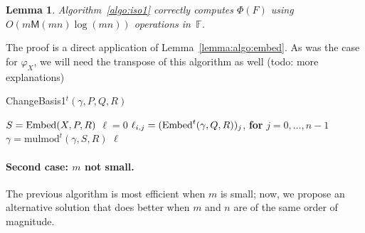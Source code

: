 \documentclass[12pt]{article}
\def\M {\ensuremath{\mathsf{M}}}
\def\F {\ensuremath{\mathbb{F}}}
\def\mulmod {\ensuremath{\mathrm{mulmod}}}
\newtheorem{Lemma}{Lemma}
\begin{document}
\begin{Lemma}
  Algorithm~\ref{algo:iso1} correctly computes $\Phi(F)$ using
  $O(m\M(mn)\log(mn))$ operations in~$\F$.
\end{Lemma}

The proof is a direct application of Lemma~\ref{lemma:algo:embed}.  As
was the case for $\varphi_X$, we will need the transpose of this
algorithm as well (todo: more explanations)
\begin{algorithm}[H]
  \caption{ChangeBasis1$^t(\gamma,P,Q,R)$}
  \begin{algorithmic}[1]
    \STATE $S={\rm Embed}(X,P,R)$
    \STATE $\ell=0$
    \STATE $\ell_{i,j} = ({\rm Embed}^t(\gamma,Q,R))_j$, {\bf for} $j=0,\dots,n-1$
    \STATE $\gamma = \mulmod^t(\gamma,S,R)$
    \ENDFOR
    \RETURN $\ell$
  \end{algorithmic}
  \label{algo:tiso1}
\end{algorithm}

\paragraph{Second case: $m$ not small.}
The previous algorithm is most efficient when $m$ is small; now, we
propose an alternative solution that does better when $m$ and $n$ are
of the same order of magnitude. 
\end{document}
